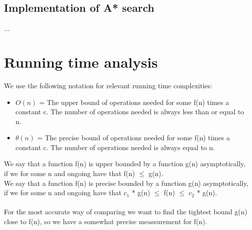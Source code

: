 \documentclass[11pt]{article}
\begin{document}
\subsection{Implementation of A* search}
...






\newpage
\section{Running time analysis}
We use the following notation for relevant running time complexities:
\begin{itemize}
    \item $O(n)$ = The upper bound of operations needed for some f(n) times a constant c. The number of operations needed is always less than or equal to n.
    \item $\theta(n)$ = The precise bound of operations needed for some f(n) times a constant c. The number of operations needed is always equal to n. 
\end{itemize}
We say that a function f(n) is upper bounded by a function g(n) asymptotically, if we for some n and ongoing have that f(n) $\leq$ g(n).\\
We say that a function f(n) is precise bounded by a function g(n) asymptotically, if we for some n and ongoing have that $c_1$ * g(n) $\leq$ f(n) $\leq$ $c_2$ * g(n).
\\\\
For the most accurate way of comparing we want to find the tightest bound g(n) close to f(n), so we have a somewhat precise meassurement for f(n). 
\end{document}
